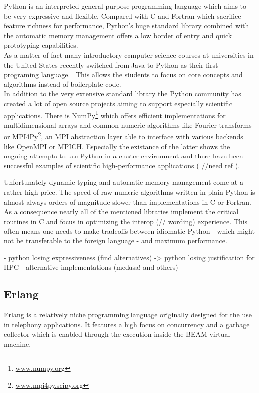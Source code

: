 Python is an interpreted general-purpose programming language which aims to be very expressive and flexible. Compared with C and Fortran which sacrifice feature richness for performance, Python's huge standard library combined with the automatic memory management offers a low border of entry and quick prototyping capabilities. \\
As a matter of fact many introductory computer science courses at universities in the United States recently switched from Java to Python as their first programing language.~\cite{GUO14} This allows the students to focus on core concepts and algorithms instead of boilerplate code.
\\


In addition to the very extensive standard library the Python community has created a lot of open source projects aiming to support especially scientific applications. There is NumPy\footnote{\url{www.numpy.org}} which offers efficient implementations for multidimensional arrays and common numeric algorithms like Fourier transforms or MPI4Py\footnote{\url{www.mpi4py.scipy.org}}, an MPI abstraction layer able to interface with various backends like OpenMPI or MPICH. Especially the existance of the latter shows the ongoing attempts to use Python in a cluster environment and there have been successful examples of scientific high-performance applications ( //need ref ).

Unfortunately dynamic typing and automatic memory management come at a rather high price. The speed of raw numeric algorithms written in plain Python is almost always orders of magnitude slower than implementations in C or Fortran. As a consequence nearly all of the mentioned libraries implement the critical routines in C and focus in optimizing the interop (// wording) experience. This often means one needs to make tradeoffs between idiomatic Python - which might not be transferable to the foreign language - and maximum performance.

- python losing expressiveness (find alternatives) -> python losing justification for HPC
- alternative implementations (medusa! and others)

\subsection*{Erlang}
\label{subsec:State_of_the_art::Candidates::Erlang}
Erlang is a relatively niche programming language originally designed for the use in telephony applications. It features a high focus on concurrency and a garbage collector which is enabled through the execution inside the BEAM virtual machine.

